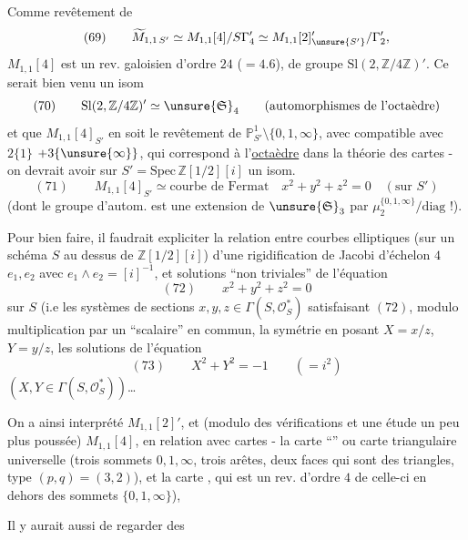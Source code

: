 Comme revêtement de 
\[
(69)\qquad
\widetilde M_{1,1\,S'}
\simeq M_{1,1}[4]/S\Gamma'_4
\simeq M_{1,1}[2]'_{\unsure{S'}}/\Gamma'_2,
\]
$M_{1,1}[4]$ est un rev. galoisien d'ordre $24$ ($=4.6$),
de groupe $\mathrm{Sl}(2,\mathbb Z/4\mathbb Z)'$.
 Ce serait bien venu  un isom
\[
(70)\qquad
\mathrm{Sl}(2,\mathbb Z/4\mathbb Z)'
\simeq\unsure{\mathfrak S}_4
\qquad
(\text{automorphismes de l'octaèdre})
\]
et que $M_{1,1}[4]_{S'}$ en soit le revêtement 
de $\mathbb P^1_{S'}\setminus\{0,1,\infty\}$, avec
 compatible avec
$2\{1\}$  $+3\{\unsure{\infty}\}$,
qui correspond à l'\uline{octaèdre} \unsure{\&} dans la théorie des
cartes - on devrait avoir sur
$S'=\mathrm{Spec}\,\mathbb Z[1/2][i]$
un isom. 
\[
(71)\qquad
M_{1,1}[4]_{S'}\simeq
\text{courbe de Fermat}
\quad
x^2+y^2+z^2=0
\quad(\text{sur }S')
\]
(dont le groupe d'autom. est  une extension de
$\unsure{\mathfrak S}_3$ par
$\mu_2^{\{0,1,\infty\}}/\mathrm{diag}$ !).


Pour bien faire, il faudrait expliciter la relation entre courbes
elliptiques  (sur un schéma $S$ au dessus de
$\mathbb Z[1/2][i]$)  d'une rigidification de Jacobi
d'échelon $4$ $e_1,e_2$ avec $e_1\wedge e_2=[i]^{-1}$, et solutions
``non triviales'' de l'équation
\[
(72)\qquad x^2+y^2+z^2=0
\]
sur $S$ (i.e les systèmes de sections
$x,y,z\in\Gamma(S,\mathcal O_S^*)$ satisfaisant $(72)$, modulo
multiplication par un ``scalaire''
en commun,  la symétrie en posant
$X=x/z$, $Y=y/z$, 
les solutions de l'équation
\[
(73)\qquad X^2+Y^2=-1\qquad(=i^2)
\]
$(X,Y\in\Gamma(S,\mathcal O_S^*))$\ldots

On a ainsi interprété $M_{1,1}[2]'$, et
(modulo des vérifications et une étude un peu plus poussée)
$M_{1,1}[4]$, en relation avec  cartes
 - la carte ``''
ou carte triangulaire  universelle
(trois sommets $0,1,\infty$,
trois arêtes, deux faces qui sont des triangles, type
$(p,q)=(3,2)$), et la carte \uline{},
qui est un rev. d'ordre $4$ de celle-ci
\unsure{(}
en dehors des sommets $\{0,1,\infty\}$),

Il y aurait  aussi de regarder des
